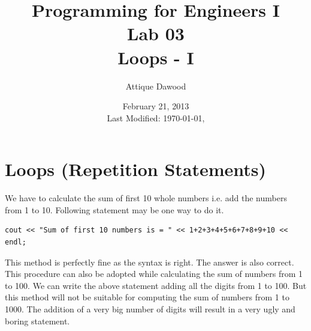 \documentclass[12pt,a4paper]{article}
\title{\vspace{-1cm}Programming for Engineers I\\Lab 03\\Loops - I}
\author{Attique Dawood}
\date{February 21, 2013\\[0.2cm] Last Modified: \today, \currenttime}
\begin{document}
\maketitle

\section{Loops (Repetition Statements)}
We have to calculate the sum of first 10 whole numbers i.e. add the numbers from 1 to 10. Following statement may be one way to do it.
\begin{verbatim}
cout << "Sum of first 10 numbers is = " << 1+2+3+4+5+6+7+8+9+10 << endl;
\end{verbatim}
This method is perfectly fine as the syntax is right. The answer is also correct. This procedure can also be adopted while calculating the sum of numbers from 1 to 100. We can write the above statement adding all the digits from 1 to 100. But this method will not be suitable for computing the sum of numbers from 1 to 1000. The addition of a very big number of digits will result in a very ugly and boring statement. 
\end{document}
